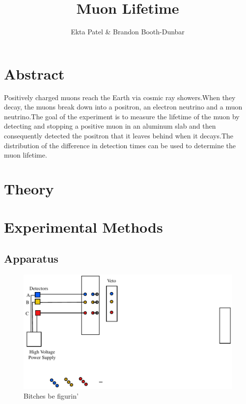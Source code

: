 
\newcommand{\ig}[2][width=4in]{\texttt{[image: \#2]}}    		
\usepackage{graphicx}					
\usepackage{amssymb}
\usepackage{pgfplotstable}
\usepackage{float}
\usepackage{caption}
\captionsetup[table]{justification=justified,singlelinecheck=false, position=bottom}


\header {\today}							
\title{Muon Lifetime}
\author{Ekta Patel \& Brandon Booth-Dunbar}

\section{Abstract}
\begin{em} Positively charged muons reach the Earth via cosmic ray showers.When they decay, the muons break down into a positron, an electron neutrino and a muon neutrino.The goal of the experiment is to measure the lifetime of the muon by detecting and stopping a positive muon in an aluminum slab and then consequently detected the positron that it leaves behind when it decays.The distribution of the difference in detection times can be used to determine the muon lifetime.
\end{em}

\section{Theory}

\section{Experimental Methods}
\subsection{Apparatus}
\begin{figure}[H]
\begin{center}
\includegraphics[width=4 in]{ML-figure1.pdf}
\caption{Bitches be figurin'}
\end{center}
\end{figure}

